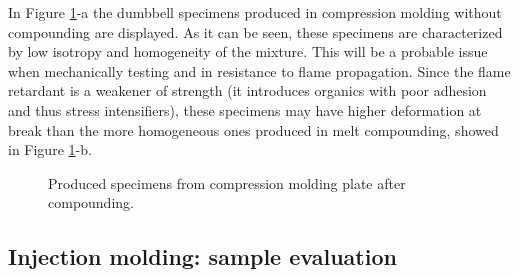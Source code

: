 \documentclass[a4paper, 11pt]{article}
\begin{document}
In Figure \ref{fig:spec}-a the dumbbell specimens produced in compression molding without compounding are displayed. As it can be seen, these specimens are characterized by low isotropy and homogeneity of the mixture. This will be a probable issue when mechanically testing and in resistance to flame propagation. Since the flame retardant is a weakener of strength (it introduces organics with poor adhesion and thus stress intensifiers), these specimens may have higher deformation at break than the more homogeneous ones produced in melt compounding, showed in Figure \ref{fig:spec}-b.
\begin{figure}[htp]
	\centering
	 \qquad
	\label{fig:spec}
	\caption{Produced specimens from compression molding plate after compounding.}
\end{figure}

\newpage

\subsection{Injection molding: sample evaluation}
\end{document}
